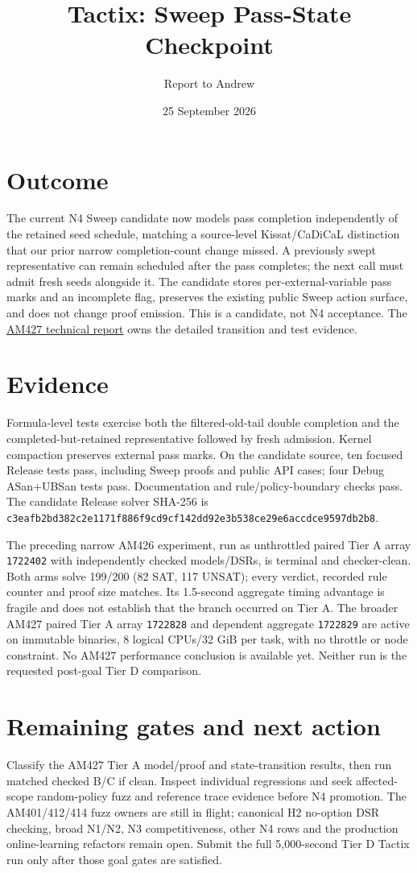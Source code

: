 \documentclass[11pt]{article}
\title{Tactix: Sweep Pass-State Checkpoint}
\author{Report to Andrew}
\date{25 September 2026}
\begin{document}
\maketitle
\vspace{-1.5em}

\section*{Outcome}
The current N4 Sweep candidate now models pass completion independently of
the retained seed schedule, matching a source-level Kissat/CaDiCaL distinction
that our prior narrow completion-count change missed. A previously swept
representative can remain scheduled after the pass completes; the next call
must admit fresh seeds alongside it. The candidate stores per-external-variable
pass marks and an incomplete flag, preserves the existing public Sweep action
surface, and does not change proof emission. This is a candidate, not N4
acceptance. The \href{../../benchmarks/reports/2026-09-25-am427-sweep-state-machine-candidate.md}{AM427 technical report}
owns the detailed transition and test evidence.

\section*{Evidence}
Formula-level tests exercise both the filtered-old-tail double completion and
the completed-but-retained representative followed by fresh admission. Kernel
compaction preserves external pass marks. On the candidate source, ten focused
Release tests pass, including Sweep proofs and public API cases; four Debug
ASan+UBSan tests pass. Documentation and rule/policy-boundary checks pass.
The candidate Release solver SHA-256 is
\texttt{c3eafb2bd382c2e1171f886f9cd9cf142dd92e3b538ce29e6accdce9597db2b8}.

The preceding narrow AM426 experiment, run as unthrottled paired Tier A array
\texttt{1722402} with independently checked models/DSRs, is terminal and
checker-clean. Both arms solve 199/200 (82 SAT, 117 UNSAT); every verdict,
recorded rule counter and proof size matches. Its 1.5-second aggregate timing
advantage is fragile and does not establish that the branch occurred on Tier A.
The broader AM427 paired Tier A array \texttt{1722828} and dependent aggregate
\texttt{1722829} are active on immutable binaries, 8 logical CPUs/32 GiB per
task, with no throttle or node constraint. No AM427 performance conclusion is
available yet. Neither run is the requested post-goal Tier D comparison.

\section*{Remaining gates and next action}
Classify the AM427 Tier A model/proof and state-transition results, then run
matched checked B/C if clean. Inspect individual regressions and seek
affected-scope random-policy fuzz and reference trace evidence before N4
promotion. The AM401/412/414 fuzz owners are still in flight; canonical H2
no-option DSR checking, broad N1/N2, N3 competitiveness, other N4 rows and
the production online-learning refactors remain open. Submit the full
5,000-second Tier D Tactix run only after those goal gates are satisfied.
\end{document}
